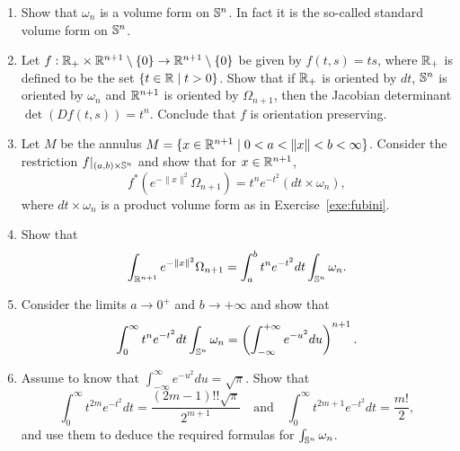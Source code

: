 \begin{exercise}
  \begin{enumerate}
    \item Show that $\omega_n$ is a volume form on $\mathbb{S}^n$. In fact it is the so-called standard volume form on $\mathbb{S}^n$.
    \item Let $f:\mathbb{R}_+\times\mathbb{R}^{n+1}\setminus\{0\}\to \mathbb{R}^{n+1}\setminus\{0\}$ be given by $f(t,s) = ts$, where $\mathbb{R}_+$ is defined to be the set $\{t\in\mathbb{R} \mid t >0\}$.
          Show that if $\mathbb{R}_+$ is oriented by $dt$, $\mathbb{S}^n$ is oriented by $\omega_n$ and $\mathbb{R}^{n+1}$ is oriented by $\Omega_{n+1}$, then the Jacobian determinant $\det(Df(t,s))= t^n$.
          Conclude that $f$ is orientation preserving.
    \item Let $M$ be the annulus $M = \{x\in\mathbb{R}^{n+1} \mid 0<a<\|x\|<b<\infty\}$. Consider the restriction $f|_{(a,b)\times \mathbb{S}^n}$ and show that for $x\in\mathbb{R}^{n+1}$,
          \begin{equation}
            f^*\left(e^{-\|x\|^2}\Omega_{n+1}\right) = t^n e^{-t^2}(dt \times \omega_n),
          \end{equation}
          where $dt\times\omega_n$ is a product volume form as in Exercise~\ref{exe:fubini}.
    \item Show that
          \begin{equation}
            \int_{\mathbb{R}^{n+1}}e^{-\|x\|^2}\Omega_{n+1} = \int_a^b t^ne^{-t^2} dt \int_{\mathbb{S}^n}\omega_n.
          \end{equation}
    \item Consider the limits $a\to0^+$ and $b\to+\infty$ and show that
          \begin{equation}
            \int_0^\infty t^n e^{-t^2} dt \int_{\mathbb{S}^n}\omega_n = \left(\int_{-\infty}^{+\infty} e^{-u^2} du\right)^{n+1}.
          \end{equation}
    \item Assume to know that $\int_{-\infty}^{\infty} e^{-u^2}du = \sqrt{\pi}$. Show that
          \begin{equation}
            \int_0^\infty t^{2m} e^{-t^2}dt = \frac{(2m-1)!!\sqrt{\pi}}{2^{m+1}}
            \quad\mbox{and}\quad
            \int_0^\infty t^{2m+1} e^{-t^2}dt = \frac{m!}{2},
          \end{equation}
          and use them to deduce the required formulas for $\int_{\mathbb{S}^n}\omega_n$.
  \end{enumerate}
\end{exercise}

